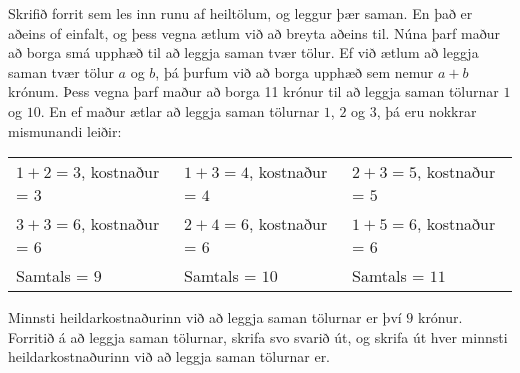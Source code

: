 \begin{problem}
	Skrifið forrit sem les inn runu af heiltölum, og leggur þær saman. En það er aðeins of einfalt, og þess vegna ætlum við að breyta aðeins til. Núna þarf maður að borga smá upphæð til að leggja saman tvær tölur. Ef við ætlum að leggja saman tvær tölur $a$ og $b$, þá þurfum við að borga upphæð sem nemur $a+b$ krónum. Þess vegna þarf maður að borga 11 krónur til að leggja saman tölurnar $1$ og $10$. En ef maður ætlar að leggja saman tölurnar $1$, $2$ og $3$, þá eru nokkrar mismunandi leiðir:
	\begin{center}
		\begin{tabular}{|l|l|l|}
			\hline
			$1 + 2 = 3$, kostnaður = $3$ & $1 + 3 = 4$, kostnaður = $4$ & $2 + 3 = 5$, kostnaður = $5$ \\
			$3 + 3 = 6$, kostnaður = $6$ & $2 + 4 = 6$, kostnaður = $6$ & $1 + 5 = 6$, kostnaður = $6$ \\
			Samtals = $9$ & Samtals = $10$ & Samtals = $11$ \\
			\hline
		\end{tabular}
	\end{center}
	Minnsti heildarkostnaðurinn við að leggja saman tölurnar er því $9$ krónur. Forritið á að leggja saman tölurnar, skrifa svo svarið út, og skrifa út hver minnsti heildarkostnaðurinn við að leggja saman tölurnar er.

\begin{example}
%
\end{example}

\begin{example}
%
\end{example}
\end{problem}